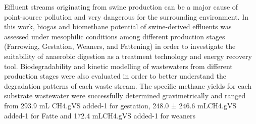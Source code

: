 Effluent streams originating from swine production can be a major cause of point-source pollution and very dangerous for the surrounding environment. In this work, biogas and biomethane potential of swine-derived effluents was assessed under mesophilic conditions among different production stages (Farrowing, Gestation, Weaners, and Fattening) in order to investigate the suitability of anaerobic digestion as a treatment technology and energy recovery tool. Biodegradability and kinetic modelling of wastewaters from different production stages were also evaluated in order to better understand the degradation patterns of each waste stream. The specific methane yields for each substrate wastewater were successfully determined gravimetrically and ranged from 293.9 mL CH4.gVS added-1 for gestation, 248.0 ± 246.6 mLCH4.gVS added-1 for Fatte and 172.4 mLCH4.gVS added-1 for weaners
